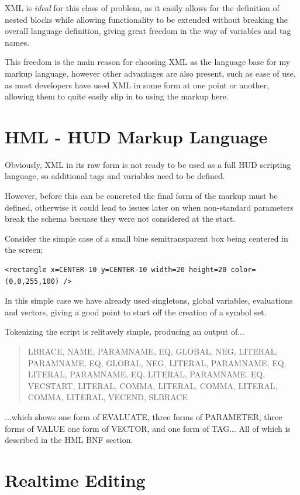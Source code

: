 \documentclass[10pt,a4paper]{article}
\begin{document}
XML is \textit{ideal} for this class of problem, as it easily allows for the definition of nested blocks while allowing functionality to be extended without breaking the overall language definition, giving great freedom in the way of variables and tag names.

This freedom is the main reason for choosing XML as the language base for my markup language, however other advantages are also present, such as ease of use, as most developers have used XML in some form at one point or another, allowing them to quite easily slip in to using the markup here.

\section{HML - HUD Markup Language}

Obviously, XML in its raw form is not ready to be used as a full HUD scripting language, so additional tags and variables need to be defined.

However, before this can be concreted the final form of the markup must be defined, otherwise it could lead to issues later on when non-standard parameters break the schema becuase they were not considered at the start.

Consider the simple case of a small blue semitransparent box being centered in the screen; 

\begin{verbatim}
<rectangle x=CENTER-10 y=CENTER-10 width=20 height=20 color=(0,0,255,100) />
\end{verbatim}

In this simple case we have already used singletons, global variables, evaluations and vectors, giving a good point to start off the creation of a symbol set.

Tokenizing the script is relitavely simple, producing an output of...

\begin{quote}
LBRACE, NAME, PARAMNAME, EQ, GLOBAL, NEG, LITERAL, PARAMNAME, EQ, GLOBAL, NEG, LITERAL, PARAMNAME, EQ, LITERAL, PARAMNAME, EQ, LITERAL, PARAMNAME, EQ, VECSTART, LITERAL, COMMA, LITERAL, COMMA, LITERAL, COMMA, LITERAL, VECEND, SLBRACE
\end{quote}

...which shows one form of EVALUATE, three forms of PARAMETER, three forms of VALUE one form of VECTOR, and one form of TAG... All of which is described in the HML BNF section.

\section{Realtime Editing}
\end{document}
